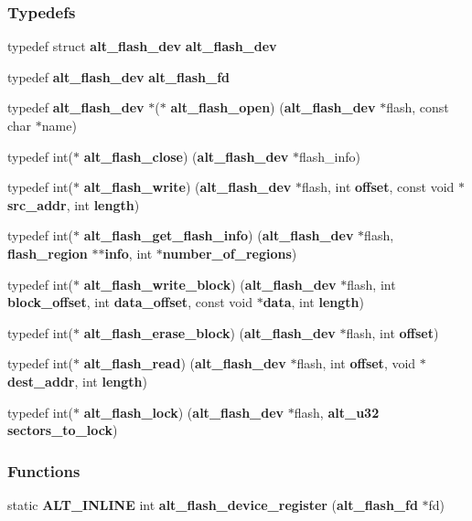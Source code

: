 \subsubsection*{Typedefs}
\begin{DoxyCompactItemize}
\item 
typedef struct {\bf alt\+\_\+flash\+\_\+dev} {\bf alt\+\_\+flash\+\_\+dev}
\item 
typedef {\bf alt\+\_\+flash\+\_\+dev} {\bf alt\+\_\+flash\+\_\+fd}
\item 
typedef {\bf alt\+\_\+flash\+\_\+dev} $\ast$($\ast$ {\bf alt\+\_\+flash\+\_\+open}) ({\bf alt\+\_\+flash\+\_\+dev} $\ast$flash, const char $\ast$name)
\item 
typedef int($\ast$ {\bf alt\+\_\+flash\+\_\+close}) ({\bf alt\+\_\+flash\+\_\+dev} $\ast$flash\+\_\+info)
\item 
typedef int($\ast$ {\bf alt\+\_\+flash\+\_\+write}) ({\bf alt\+\_\+flash\+\_\+dev} $\ast$flash, int {\bf offset}, const void $\ast${\bf src\+\_\+addr}, int {\bf length})
\item 
typedef int($\ast$ {\bf alt\+\_\+flash\+\_\+get\+\_\+flash\+\_\+info}) ({\bf alt\+\_\+flash\+\_\+dev} $\ast$flash, {\bf flash\+\_\+region} $\ast$$\ast${\bf info}, int $\ast${\bf number\+\_\+of\+\_\+regions})
\item 
typedef int($\ast$ {\bf alt\+\_\+flash\+\_\+write\+\_\+block}) ({\bf alt\+\_\+flash\+\_\+dev} $\ast$flash, int {\bf block\+\_\+offset}, int {\bf data\+\_\+offset}, const void $\ast${\bf data}, int {\bf length})
\item 
typedef int($\ast$ {\bf alt\+\_\+flash\+\_\+erase\+\_\+block}) ({\bf alt\+\_\+flash\+\_\+dev} $\ast$flash, int {\bf offset})
\item 
typedef int($\ast$ {\bf alt\+\_\+flash\+\_\+read}) ({\bf alt\+\_\+flash\+\_\+dev} $\ast$flash, int {\bf offset}, void $\ast${\bf dest\+\_\+addr}, int {\bf length})
\item 
typedef int($\ast$ {\bf alt\+\_\+flash\+\_\+lock}) ({\bf alt\+\_\+flash\+\_\+dev} $\ast$flash, {\bf alt\+\_\+u32} {\bf sectors\+\_\+to\+\_\+lock})
\end{DoxyCompactItemize}
\subsubsection*{Functions}
\begin{DoxyCompactItemize}
\item 
static {\bf A\+L\+T\+\_\+\+I\+N\+L\+I\+NE} int {\bf alt\+\_\+flash\+\_\+device\+\_\+register} ({\bf alt\+\_\+flash\+\_\+fd} $\ast$fd)
\end{DoxyCompactItemize}


